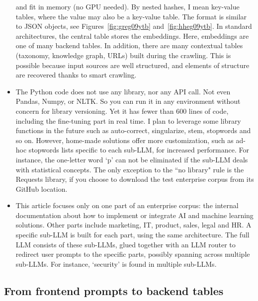 \documentclass[10pt]{article}
\begin{document}
\begin{itemize}
and fit in memory (no GPU needed). By nested hashes, I mean \textcolor{index}{key-value tables}, where the value may also be a key-value table. The format is similar to \textcolor{index}{JSON} objects, see Figures~\ref{fig:greg09ytb} and~\ref{fig:hheg09ytb}. In standard architectures, the central table stores the embeddings. Here, embeddings are one of many backend tables. In addition, there are many contextual tables (taxonomy, knowledge graph, URLs) built during the crawling. This is possible because input sources are well structured, and elements of structure are recovered thanks to \textcolor{index}{smart crawling}.  
\vspace{1ex}
\item The Python code does not use any library, nor any API call. Not even Pandas, Numpy, or NLTK. So you can run it in any environment without concern for
 library versioning. Yet it has fewer than 600 lines of code, including the fine-tuning part in real time. I plan to leverage some library functions in the future
such as auto-correct, singularize, stem, stopwords and so on. However, home-made solutions offer more customization, such as ad-hoc 
\textcolor{index}{stopwords} lists
 specific to each sub-LLM, for increased performance.   For instance, the one-letter word `p' can not be eliminated if the sub-LLM deals 
with statistical concepts. The only exception to the ``no library" rule is the Requests library, if you choose to download the test enterprise corpus from 
its GitHub location.
\vspace{1ex}
\item This article focuses only on one part of an enterprise corpus: the internal documentation about how to implement or integrate AI 
 and machine learning solutions. Other parts include marketing, IT, product, sales, legal and HR. A specific sub-LLM is built for each part, using the same architecture. The 
 full LLM consists of these sub-LLMs, glued together with an \textcolor{index}{LLM router} to redirect user prompts to the specific parts, possibly spanning  
across multiple sub-LLMs. For instance, `security' is found in multiple sub-LLMs. 
\end{itemize}
\vspace{1ex}

\subsection{From frontend prompts to backend tables}
\end{document}
